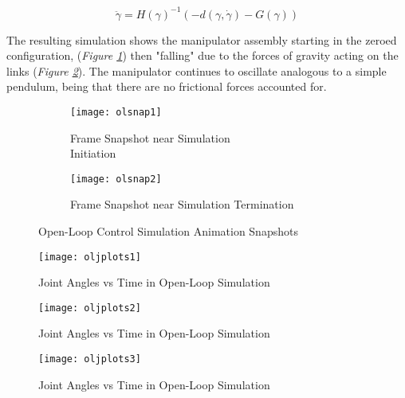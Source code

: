 \begin{equation}
\ddot{\gamma}=H(\gamma)^{-1}(-d(\gamma, \dot{\gamma})-G(\gamma))
\label{eq:eoms2}
\end{equation}

The resulting simulation shows the manipulator assembly starting in the zeroed configuration, (\emph{Figure \ref{fig:olsnap1}}) then "falling" due to the forces of gravity acting on the links (\emph{Figure \ref{fig:olsnap2}}). The manipulator continues to oscillate analogous to a simple pendulum, being that there are no frictional forces accounted for.

\begin{figure}[htp]
  \center
  \begin{subfigure}[c]{0.5\textwidth}
  \center
  \texttt{[image: olsnap1]}
  \caption{Frame Snapshot near Simulation \\Initiation}
  \label{fig:olsnap1}
\end{subfigure}%
\begin{subfigure}[c]{0.5\textwidth}
  \center
  \texttt{[image: olsnap2]}
  \caption{Frame Snapshot near Simulation Termination}
  \label{fig:olsnap2}
\end{subfigure}
  \caption{Open-Loop Control Simulation Animation Snapshots}
  \label{fig:olsnaps}
\end{figure}

\begin{figure}[htp]
  \center
  \texttt{[image: oljplots1]}
  \caption{Joint Angles vs Time in Open-Loop Simulation}
  \label{fig:oljplots1}
\end{figure}
\begin{figure}[htp]
  \center
  \ContinuedFloat
  \captionsetup{list=off,format=cont}
  \texttt{[image: oljplots2]}
  \caption{Joint Angles vs Time in Open-Loop Simulation}
  \label{fig:oljplots2}
\end{figure}
\begin{figure}[htp]
  \center
  \ContinuedFloat
  \captionsetup{list=off,format=cont}
  \texttt{[image: oljplots3]}
  \caption{Joint Angles vs Time in Open-Loop Simulation}
  \label{fig:oljplots3}
\end{figure}

\newpage
